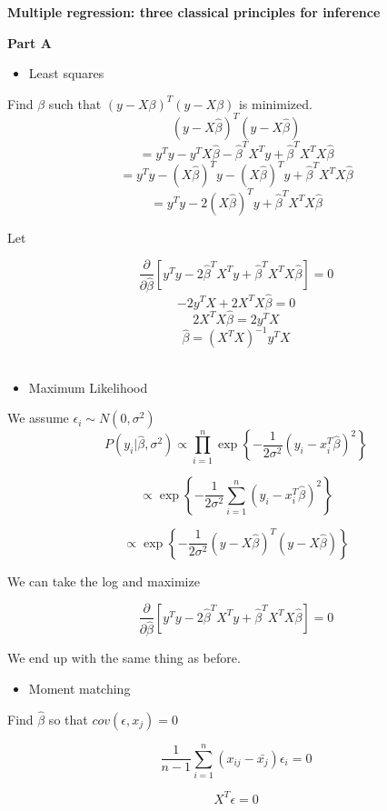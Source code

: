 \documentclass[12pt]{amsart}
\begin{document}
{\bf \large Multiple regression: three classical principles for inference} 
\bigskip

{\bf Part A}\\
\bigskip
\bigskip
\begin{itemize}
    \item Least squares 
\end{itemize}
\medskip

Find $\beta$ such that $(y-X\beta)^T (y-X\beta)$ is minimized.
$$(y-X\hat{\beta})^T (y-X\hat{\beta}) $$
$$=y^Ty-y^TX\hat{\beta} -\hat{\beta}^TX^Ty  + \hat{\beta}^TX^TX\hat{\beta}$$
$$=y^Ty-(X\hat{\beta})^Ty -(X\hat{\beta})^Ty  + \hat{\beta}^TX^TX\hat{\beta}$$
$$=y^Ty -2(X\hat{\beta})^Ty  + \hat{\beta}^TX^TX\hat{\beta}$$

Let

$$ \frac{\partial}{\partial \hat{\beta}}[y^Ty -2\hat{\beta}^TX^Ty  + \hat{\beta}^TX^TX\hat{\beta}] = 0$$
$$ -2y^TX + 2X^TX\hat{\beta} = 0$$
$$ 2X^TX\hat{\beta} = 2y^TX $$
$$ \hat{\beta} = (X^TX)^{-1}y^TX $$\\

\begin{itemize}
    \item Maximum Likelihood
\end{itemize}
\medskip

We assume $\epsilon_i \sim N(0, \sigma^2)$
$$ P(y_i|\hat{\beta}, \sigma^2) \propto \prod_{i=1}^{n} \exp\left\{-\frac{1}{2\sigma^2}(y_i - x_i^T\hat{\beta})^2 \right \}$$

$$  \propto \exp\left\{-\frac{1}{2\sigma^2}\sum_{i=1}^{n}(y_i - x_i^T\hat{\beta})^2 \right \}$$


$$  \propto \exp\left\{-\frac{1}{2\sigma^2}(y-X\hat{\beta})^T(y-X\hat{\beta}) \right \}$$

We can take the log and maximize


$$ \frac{\partial}{\partial \hat{\beta}}[y^Ty -2\hat{\beta}^TX^Ty  + \hat{\beta}^TX^TX\hat{\beta}] = 0$$

We end up with the same thing as before. \\

\begin{itemize}
    \item Moment matching
\end{itemize}
\medskip

Find $\hat{\beta}$ so that $cov(\epsilon, x_j)=0$

$$ \frac{1}{n-1}\sum_{i=1}^{n}(x_{ij}-\bar{x_j})\epsilon_i=0$$

$$X^T \epsilon = 0$$ 
\end{document}
